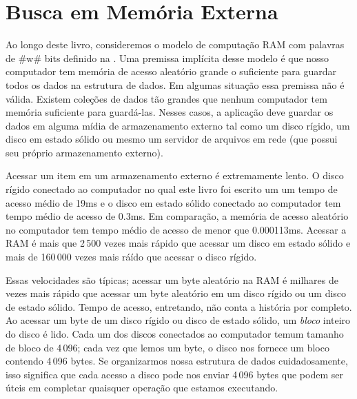 \chapter{Busca em Memória Externa}

Ao longo deste livro, consideremos o modelo de computação RAM com palavras de #w# bits definido na .   Uma premissa implícita desse
modelo é que nosso computador tem memória de acesso aleatório grande o suficiente para guardar todos os dados na estrutura de dados.
Em algumas situação essa premissa não é válida. Existem coleções de dados
tão grandes que nenhum computador tem memória suficiente para guardá-las.
Nesses casos, a aplicação deve guardar os dados em alguma mídia de armazenamento
externo tal como um disco rígido, um disco em estado sólido ou mesmo um servidor de arquivos em rede (que possui seu próprio armazenamento externo).

%
%
%
%
Acessar um item em um armazenamento externo é extremamente lento.
O disco rígido conectado ao computador no qual este livro foi escrito um
um tempo de acesso médio de 19ms e o disco em estado sólido conectado ao computador
tem tempo médio de acesso de 0.3ms. Em comparação, a memória de acesso aleatório
no computador tem tempo médio de acesso de menor que
0.000113ms. 
Acessar a RAM é mais que 2\,500 vezes mais rápido que acessar um disco em estado sólido e mais de 160\,000 vezes mais ráído que acessar o disco rígido.

% 
% 

Essas velocidades são típicas; acessar um byte aleatório na RAM é
milhares de vezes mais rápido que acessar um byte aleatório em um disco
rígido ou um disco de estado sólido. Tempo de acesso, entretando, não
conta a história por completo. Ao acessar um byte de um disco rígido ou 
disco de estado sólido, um \emph{bloco} inteiro
%
do disco é lido. Cada um dos discos conectados ao computador temum tamanho 
de bloco de 4\,096; cada vez que lemos um byte, o disco nos fornece um bloco
contendo 4\,096 bytes. Se organizarmos nossa estrutura de dados cuidadosamente, isso
significa que cada acesso a disco pode nos enviar 4\,096 bytes que podem
ser úteis em completar quaisquer operação que estamos executando. 

